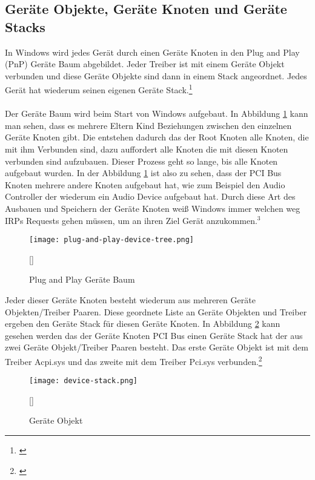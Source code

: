 \subsection{Geräte Objekte, Geräte Knoten und Geräte Stacks}
In Windows wird jedes Gerät durch einen Geräte Knoten in den Plug and Play (PnP) Geräte Baum abgebildet. Jeder Treiber ist mit einem Geräte Objekt verbunden und diese Geräte Objekte sind dann in einem Stack angeordnet. Jedes Gerät hat wiederum seinen eigenen Geräte Stack.\footnote[4]{\cite[Vgl.][]{24}}
\\\\
Der Geräte Baum wird beim Start von Windows aufgebaut. In Abbildung \ref{windows-plug-and-play-tree} kann man sehen, dass es mehrere Eltern Kind Beziehungen zwischen den einzelnen Geräte Knoten gibt. Die entstehen dadurch das der Root Knoten alle Knoten, die mit ihm Verbunden sind, dazu auffordert alle Knoten die mit diesen Knoten verbunden sind aufzubauen. Dieser Prozess geht so lange, bis alle Knoten aufgebaut wurden. In der Abbildung \ref{windows-plug-and-play-tree} ist also zu sehen, dass der PCI Bus Knoten mehrere andere Knoten aufgebaut hat, wie zum Beispiel den Audio Controller der wiederum ein Audio Device aufgebaut hat. Durch diese Art des Ausbauen und Speichern der Geräte Knoten weiß Windows immer welchen weg IRPs Requests gehen müssen, um an ihren Ziel Gerät anzukommen.$^{3}$
\newpage
\begin{figure}[H]
    \centering
    \texttt{[image: plug-and-play-device-tree.png]}
    \caption[Plug and Play Geräte Baum]{Plug and Play Geräte Baum}[\cite{24}]
    \label{windows-plug-and-play-tree} 
\end{figure}
\noindent
Jeder dieser Geräte Knoten besteht wiederum aus mehreren Geräte Objekten/Treiber Paaren. Diese geordnete Liste an Geräte Objekten und Treiber ergeben den Geräte Stack für diesen Geräte Knoten. In Abbildung \ref{windows-device-object} kann gesehen werden das der Geräte Knoten PCI Bus einen Geräte Stack hat der aus zwei Geräte Objekt/Treiber Paaren besteht. Das erste Geräte Objekt ist mit dem Treiber Acpi.sys und das zweite mit dem Treiber Pci.sys verbunden.\footnote[1]{\cite[Vgl.][]{24}}
\begin{figure}[H]
    \centering
    \texttt{[image: device-stack.png]}
    \caption[Geräte Objekt]{Geräte Objekt}[\cite{24}]
    \label{windows-device-object}
\end{figure}
\noindent

\newpage

